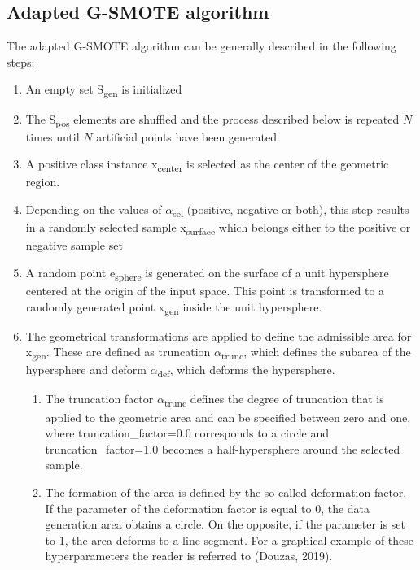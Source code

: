 \documentclass[parskip=full]{scrartcl}
\begin{document}

\subsection{Adapted G-SMOTE algorithm}

The adapted G-SMOTE algorithm can be generally described in the following steps:

\begin{enumerate}
	\item 
	An empty set S\textsubscript{gen} is initialized
	\item 
	The S\textsubscript{pos} elements are shuffled and the process described 
	below is repeated $\mathit{N}$ times until $\mathit{N}$ artificial points 
	have been generated.
	\item 
	A positive class instance x\textsubscript{center} is selected as the center 
	of the geometric region.
	\item 
	Depending on the values of $\alpha$\textsubscript{sel} (positive, negative 
	or both), this step results in a randomly selected sample 
	x\textsubscript{surface} which belongs either to the positive or negative 
	sample set
	\item 
	A random point e\textsubscript{sphere} is generated on the surface of a 
	unit hypersphere centered at the origin of the input space. This point is 
	transformed to a randomly generated point x\textsubscript{gen} inside the 
	unit hypersphere. 
	\item 
	The geometrical transformations are applied to define the admissible area 
	for x\textsubscript{gen}. These are defined as truncation 
	$\alpha$\textsubscript{trunc}, which defines the subarea of the hypersphere 
	and deform $\alpha$\textsubscript{def}, which deforms the hypersphere. 
	
	\begin{enumerate}[label=($\alph*$)]
		\item 
		The truncation factor $\alpha$\textsubscript{trunc} defines the degree 
		of truncation that is applied to the geometric area and can be 
		specified between zero and one, where truncation\_factor=0.0 
		corresponds to a circle and truncation\_factor=1.0 becomes a 
		half-hypersphere around the selected sample. 
		
		\item 
		The formation of the area is defined by the so-called deformation 
		factor. If the parameter of the deformation factor is equal to 0, the 
		data generation area obtains a circle. On the opposite, if the 
		parameter is set to 1, the area deforms to a line segment. 
		For a graphical example of these hyperparameters the reader is referred 
		to (Douzas, 2019).
	\end{enumerate}


\end{enumerate}
\end{document}
